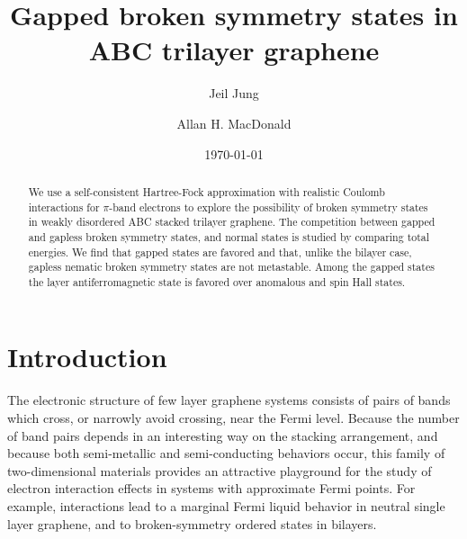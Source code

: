 \documentclass[twocolumn,prb,showpacs,preprintnumbers,amsmath,amssymb]{revtex4}
\begin{document}
\title{Gapped broken symmetry states in ABC trilayer graphene}
\author{Jeil Jung} 
\author{Allan H. MacDonald} 
\date{\today{}}
\begin{abstract}
We use a self-consistent Hartree-Fock approximation
with realistic Coulomb interactions for $\pi$-band electrons 
to explore the possibility of broken symmetry states in 
weakly disordered ABC stacked trilayer graphene.  
The competition between gapped and gapless broken symmetry states,
and normal states is studied by comparing total energies.
We find that gapped states are favored and that, unlike the 
bilayer case, gapless nematic broken symmetry states are not metastable.
Among the gapped states the layer antiferromagnetic state is favored over anomalous
and spin Hall states.
\end{abstract}
\maketitle


\noindent
\section{Introduction}
The electronic structure of few layer graphene\cite{multi,hongki1} systems consists of pairs of 
bands which cross, or narrowly avoid crossing, near the Fermi level.  Because the number of 
band pairs depends in an interesting way on the stacking arrangement, 
and because both semi-metallic and semi-conducting behaviors occur, 
this family of two-dimensional materials provides an attractive playground for the study of electron interaction 
effects in systems\cite{abrikosov,dirachf} with approximate Fermi points.
For example, interactions lead to a marginal Fermi liquid behavior
in neutral single layer graphene,\cite{guinea,Manchester_Velocity} and to 
broken-symmetry ordered states in bilayers.
\cite{hongki,bilayers_gap,bilayers_nem,bilayers_bsymsurvey,jeilbilayer,fan,jairo,geim,yacoby}
\end{document}
